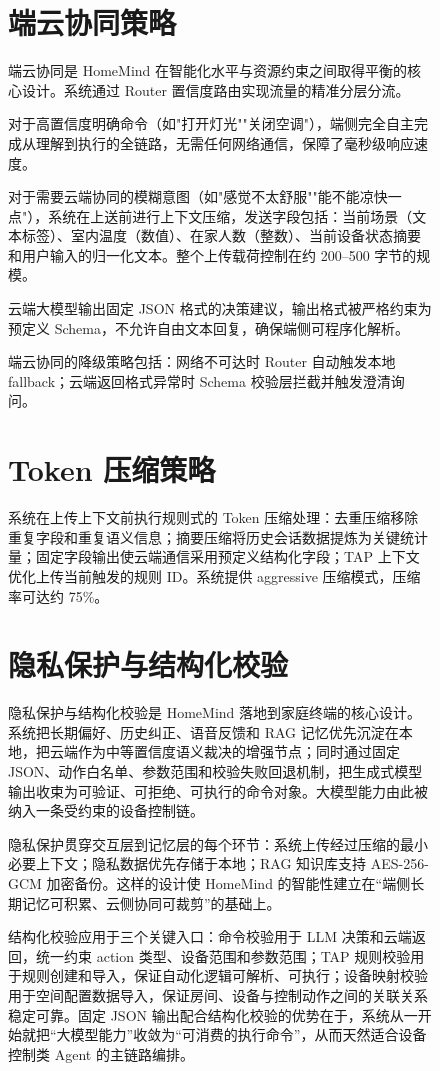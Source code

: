 \documentclass[12pt,a4paper,oneside]{ctexrep}
\begin{document}
\begin{figure}[H]
\section{端云协同策略}

端云协同是 HomeMind 在智能化水平与资源约束之间取得平衡的核心设计。系统通过 Router 置信度路由实现流量的精准分层分流。

对于高置信度明确命令（如"打开灯光""关闭空调"），端侧完全自主完成从理解到执行的全链路，无需任何网络通信，保障了毫秒级响应速度。

对于需要云端协同的模糊意图（如"感觉不太舒服""能不能凉快一点"），系统在上送前进行上下文压缩，发送字段包括：当前场景（文本标签）、室内温度（数值）、在家人数（整数）、当前设备状态摘要和用户输入的归一化文本。整个上传载荷控制在约 200--500 字节的规模。

云端大模型输出固定 JSON 格式的决策建议，输出格式被严格约束为预定义 Schema，不允许自由文本回复，确保端侧可程序化解析。

端云协同的降级策略包括：网络不可达时 Router 自动触发本地 fallback；云端返回格式异常时 Schema 校验层拦截并触发澄清询问。

\section{Token 压缩策略}

系统在上传上下文前执行规则式的 Token 压缩处理：去重压缩移除重复字段和重复语义信息；摘要压缩将历史会话数据提炼为关键统计量；固定字段输出使云端通信采用预定义结构化字段；TAP 上下文优化上传当前触发的规则 ID。系统提供 aggressive 压缩模式，压缩率可达约 75\%。

\section{隐私保护与结构化校验}

隐私保护与结构化校验是 HomeMind 落地到家庭终端的核心设计。系统把长期偏好、历史纠正、语音反馈和 RAG 记忆优先沉淀在本地，把云端作为中等置信度语义裁决的增强节点；同时通过固定 JSON、动作白名单、参数范围和校验失败回退机制，把生成式模型输出收束为可验证、可拒绝、可执行的命令对象。大模型能力由此被纳入一条受约束的设备控制链。

隐私保护贯穿交互层到记忆层的每个环节：系统上传经过压缩的最小必要上下文；隐私数据优先存储于本地；RAG 知识库支持 AES-256-GCM 加密备份。这样的设计使 HomeMind 的智能性建立在“端侧长期记忆可积累、云侧协同可裁剪”的基础上。

结构化校验应用于三个关键入口：命令校验用于 LLM 决策和云端返回，统一约束 action 类型、设备范围和参数范围；TAP 规则校验用于规则创建和导入，保证自动化逻辑可解析、可执行；设备映射校验用于空间配置数据导入，保证房间、设备与控制动作之间的关联关系稳定可靠。固定 JSON 输出配合结构化校验的优势在于，系统从一开始就把“大模型能力”收敛为“可消费的执行命令”，从而天然适合设备控制类 Agent 的主链路编排。


\end{figure}
\end{document}
